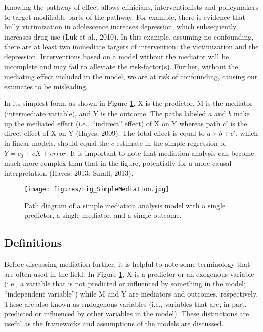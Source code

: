 \documentclass[]{DissertateUSU}
\begin{document}
Knowing the pathway of effect allows clinicians, interventionists and
policymakers to target modifiable parts of the pathway. For example,
there is evidence that bully victimization in adolescence increases
depression, which subsequently increases drug use (Luk et al., 2010). In
this example, assuming no confounding, there are at least two immediate
targets of intervention: the victimization and the depression.
Interventions based on a model without the mediator will be incomplete
and may fail to alleviate the risk-factor(s). Further, without the
mediating effect included in the model, we are at risk of confounding,
causing our estimates to be misleading.

In its simplest form, as shown in Figure \ref{fig:simplemed}, X is the
predictor, M is the mediator (intermediate variable), and Y is the
outcome. The paths labeled \(a\) and \(b\) make up the mediated effect
(i.e., ``indirect'' effect) of X on Y whereas path \(c'\) is the direct
effect of X on Y (Hayes, 2009). The total effect is equal to
\(a \times b + c'\), which in linear models, should equal the \(c\)
estimate in the simple regression of \(Y = c_0 + cX + error\). It is
important to note that mediation analysis can become much more complex
than that in the figure, potentially for a more causal interpretation
(Hayes, 2013; Small, 2013).

\begin{figure}
  \centering
  \texttt{[image: figures/Fig\_SimpleMediation.jpg]}
  \caption{Path diagram of a simple mediation analysis model with a single predictor, a single mediator, and a single outcome.}
  \label{fig:simplemed}
\end{figure}

\subsection{Definitions}\label{definitions}

Before discussing mediation further, it is helpful to note some
terminology that are often used in the field. In Figure
\ref{fig:simplemed}, X is a predictor or an exogenous variable (i.e., a
variable that is not predicted or influenced by something in the model;
``independent variable'') while M and Y are mediators and outcomes,
respectively. These are also known as endogenous variables (i.e.,
variables that are, in part, predicted or influenced by other variables
in the model). These distinctions are useful as the frameworks and
assumptions of the models are discussed.
\end{document}

